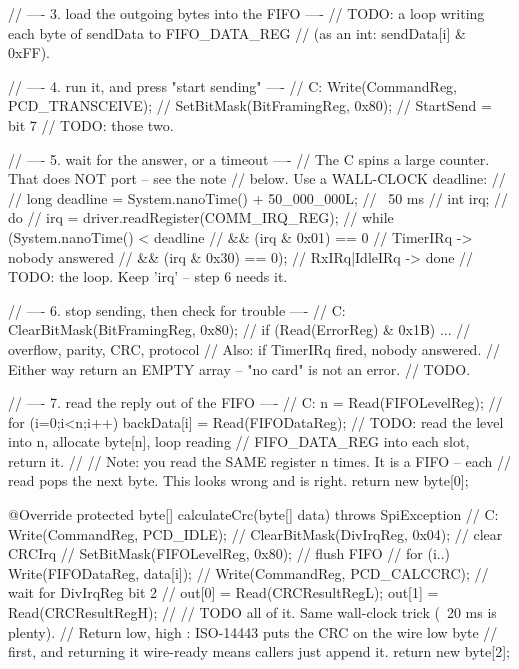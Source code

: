 \begin{jcode}
{{        // ---- 3. load the outgoing bytes into the FIFO ----
        // TODO: a loop writing each byte of sendData to FIFO_DATA_REG
        //       (as an int: sendData[i] & 0xFF).

        // ---- 4. run it, and press "start sending" ----
        //   C: Write(CommandReg, PCD_TRANSCEIVE);
        //      SetBitMask(BitFramingReg, 0x80);   // StartSend = bit 7
        // TODO: those two.

        // ---- 5. wait for the answer, or a timeout ----
        //   The C spins a large counter. That does NOT port -- see the note
        //   below. Use a WALL-CLOCK deadline:
        //
        //   long deadline = System.nanoTime() + 50_000_000L;   // ~50 ms
        //   int irq;
        //   do {
        //       irq = driver.readRegister(COMM_IRQ_REG);
        //   } while (System.nanoTime() < deadline
        //            && (irq & 0x01) == 0      // TimerIRq -> nobody answered
        //            && (irq & 0x30) == 0);    // RxIRq|IdleIRq -> done
        // TODO: the loop. Keep 'irq' -- step 6 needs it.

        // ---- 6. stop sending, then check for trouble ----
        //   C: ClearBitMask(BitFramingReg, 0x80);
        //      if (Read(ErrorReg) & 0x1B) ...   // overflow, parity, CRC, protocol
        //   Also: if TimerIRq fired, nobody answered.
        //   Either way return an EMPTY array -- "no card" is not an error.
        // TODO.

        // ---- 7. read the reply out of the FIFO ----
        //   C: n = Read(FIFOLevelReg);
        //      for (i=0;i<n;i++) backData[i] = Read(FIFODataReg);
        // TODO: read the level into n, allocate byte[n], loop reading
        //       FIFO_DATA_REG into each slot, return it.
        //
        //   Note: you read the SAME register n times. It is a FIFO -- each
        //   read pops the next byte. This looks wrong and is right.
        return new byte[0];
    }

    @Override
    protected byte[] calculateCrc(byte[] data) throws SpiException {
        //   C: Write(CommandReg, PCD_IDLE);
        //      ClearBitMask(DivIrqReg, 0x04);   // clear CRCIrq
        //      SetBitMask(FIFOLevelReg, 0x80);  // flush FIFO
        //      for (i..) Write(FIFODataReg, data[i]);
        //      Write(CommandReg, PCD_CALCCRC);
        //      wait for DivIrqReg bit 2
        //      out[0] = Read(CRCResultRegL);  out[1] = Read(CRCResultRegH);
        //
        // TODO all of it. Same wall-clock trick (~20 ms is plenty).
        // Return { low, high }: ISO-14443 puts the CRC on the wire low byte
        // first, and returning it wire-ready means callers just append it.
        return new byte[2];
    }
}
\end{jcode}

